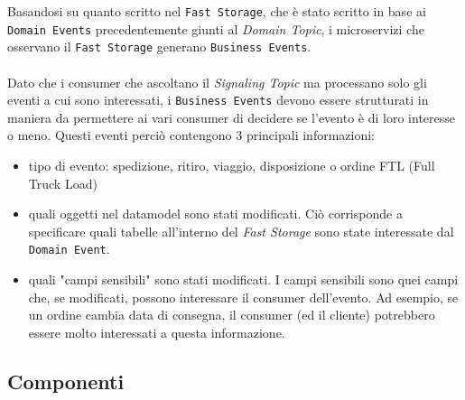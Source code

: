 Basandosi su quanto scritto nel \texttt{Fast Storage}, che è stato scritto in base ai \texttt{Domain Events} precedentemente giunti al \textit{Domain Topic},
i microservizi che osservano il \texttt{Fast Storage} generano \texttt{Business Events}.
\\\\
Dato che i consumer che ascoltano il \textit{Signaling Topic} ma processano solo gli eventi a cui sono interessati, 
i \texttt{Business Events} devono essere strutturati in maniera da permettere ai vari consumer di decidere se l'evento è di loro interesse o meno.
Questi eventi perciò contengono 3 principali informazioni:
\begin{itemize}
\item tipo di evento: spedizione, ritiro, viaggio, disposizione o ordine FTL (Full Truck Load)
\item quali oggetti nel datamodel sono stati modificati.
Ciò corrisponde a specificare quali tabelle all'interno del \textit{Fast Storage} sono state interessate dal \texttt{Domain Event}.
\item quali "campi sensibili" sono stati modificati.
I campi sensibili sono quei campi che, se modificati, possono interessare il consumer dell'evento.
Ad esempio, se un ordine cambia data di consegna, il consumer (ed il cliente) potrebbero essere molto interessati a questa informazione.
\end{itemize}



\subsection{Componenti}
\label{subsec:components}

